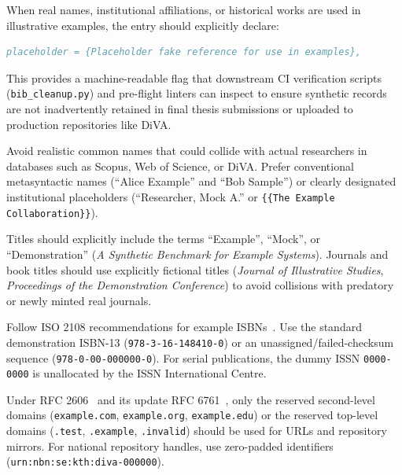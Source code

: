 \documentclass[12pt, twoside]{article}
\begin{document}
\begin{description}[style=nextline, labelwidth=\widthof{\textbf{Domains \& URIs}}, leftmargin=!]
    \item[Explicit Metadata Markers (\texttt{placeholder})]
    When real names, institutional affiliations, or historical works are used in illustrative examples, the entry should explicitly declare:
\begin{lstlisting}[language={BibTeX}, basicstyle=\small\ttfamily]
placeholder = {Placeholder fake reference for use in examples},
\end{lstlisting}
    This provides a machine-readable flag that downstream \gls{CI} verification scripts (\eg \texttt{bib\_cleanup.py}) and pre-flight linters can inspect to ensure synthetic records are not inadvertently retained in final thesis submissions or uploaded to production repositories like \gls{DiVA}.

    \item[Authors \& Consortia]
    Avoid realistic common names that could collide with actual researchers in databases such as Scopus, Web of Science, or DiVA. Prefer conventional metasyntactic names (\eg \enquote{Alice Example} and \enquote{Bob Sample}) or clearly designated institutional placeholders (\eg \enquote{Researcher, Mock A.} or \texttt{\{\{The Example Collaboration\}\}}).

    \item[Titles \& Publication Venues]
    Titles should explicitly include the terms \enquote{Example}, \enquote{Mock}, or \enquote{Demonstration} (\eg \textit{A Synthetic Benchmark for Example Systems}). Journals and book titles should use explicitly fictional titles (\eg \textit{Journal of Illustrative Studies}, \textit{Proceedings of the Demonstration Conference}) to avoid collisions with predatory or newly minted real journals.

    \item[ISBNs \& ISSNs]
    Follow \gls{ISO} 2108 recommendations for example \glspl{ISBN}~\cite{iso2108:2017}. Use the standard demonstration ISBN-13 (\texttt{978-3-16-148410-0}) or an unassigned/failed-checksum sequence (\eg \texttt{978-0-00-000000-0}). For serial publications, the dummy \gls{ISSN} \texttt{0000-0000} is unallocated by the \gls{ISSN} International Centre.

    \item[Domains \& URIs]
    Under \gls{RFC} 2606~\cite{rfc2606} and its update \gls{RFC} 6761~\cite{rfc6761}, only the reserved second-level domains (\texttt{example.com}, \texttt{example.org}, \texttt{example.edu}) or the reserved top-level domains (\texttt{.test}, \texttt{.example}, \texttt{.invalid}) should be used for \glspl{URL} and repository mirrors. For national repository handles, use zero-padded identifiers (\eg \texttt{urn:nbn:se:kth:diva-000000}).
\end{description}
\end{document}
